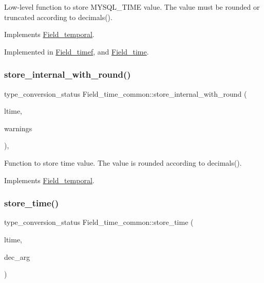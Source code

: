 Low-\/level function to store M\+Y\+S\+Q\+L\+\_\+\+T\+I\+ME value. The value must be rounded or truncated according to decimals(). 

Implements \mbox{\hyperlink{classField__temporal_a21c90848108fc5d00bad242efce2b490}{Field\+\_\+temporal}}.



Implemented in \mbox{\hyperlink{classField__timef_a37416bd1f9b3950b45bb0e450f87aa84}{Field\+\_\+timef}}, and \mbox{\hyperlink{classField__time_a1589d404d2bc1d05aafc429e05f5308c}{Field\+\_\+time}}.

\mbox{\label{classField__time__common_af094223508c3096845af6a1d95caa82c}} 
\subsubsection{\texorpdfstring{store\+\_\+internal\+\_\+with\+\_\+round()}{store\_internal\_with\_round()}}
{\footnotesize\ttfamily type\+\_\+conversion\+\_\+status Field\+\_\+time\+\_\+common\+::store\+\_\+internal\+\_\+with\+\_\+round (\begin{DoxyParamCaption}\item[{M\+Y\+S\+Q\+L\+\_\+\+T\+I\+ME $\ast$}]{ltime,  }\item[{int $\ast$}]{warnings }\end{DoxyParamCaption})\hspace{0.3cm}{\ttfamily [protected]}, {\ttfamily [virtual]}}

Function to store time value. The value is rounded according to decimals(). 

Implements \mbox{\hyperlink{classField__temporal_ae2be4bf490d06f2f1707bee19dcbebf4}{Field\+\_\+temporal}}.

\mbox{\label{classField__time__common_a679289fc41b3c0f5bf4f20a31d0e67d3}} 
\subsubsection{\texorpdfstring{store\+\_\+time()}{store\_time()}}
{\footnotesize\ttfamily type\+\_\+conversion\+\_\+status Field\+\_\+time\+\_\+common\+::store\+\_\+time (\begin{DoxyParamCaption}\item[{M\+Y\+S\+Q\+L\+\_\+\+T\+I\+ME $\ast$}]{ltime,  }\item[{uint8}]{dec\+\_\+arg }\end{DoxyParamCaption})\hspace{0.3cm}{\ttfamily [virtual]}}

